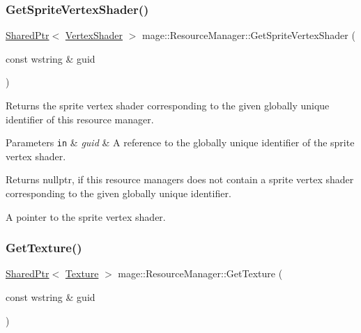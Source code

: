 \subsubsection{\texorpdfstring{Get\+Sprite\+Vertex\+Shader()}{GetSpriteVertexShader()}}
{\footnotesize\ttfamily \hyperlink{namespacemage_a1e01ae66713838a7a67d30e44c67703e}{Shared\+Ptr}$<$ \hyperlink{classmage_1_1_vertex_shader}{Vertex\+Shader} $>$ mage\+::\+Resource\+Manager\+::\+Get\+Sprite\+Vertex\+Shader (\begin{DoxyParamCaption}\item[{const wstring \&}]{guid }\end{DoxyParamCaption})\hspace{0.3cm}{\ttfamily [noexcept]}}

Returns the sprite vertex shader corresponding to the given globally unique identifier of this resource manager.


\begin{DoxyParams}[1]{Parameters}
\mbox{\tt in}  & {\em guid} & A reference to the globally unique identifier of the sprite vertex shader. \\
\hline
\end{DoxyParams}
\begin{DoxyReturn}{Returns}
{\ttfamily nullptr}, if this resource managers does not contain a sprite vertex shader corresponding to the given globally unique identifier. 

A pointer to the sprite vertex shader. 
\end{DoxyReturn}
\hypertarget{classmage_1_1_resource_manager_a2aaa87096cb50a43fdacb5cdb7d729a8}{}\label{classmage_1_1_resource_manager_a2aaa87096cb50a43fdacb5cdb7d729a8} 
\subsubsection{\texorpdfstring{Get\+Texture()}{GetTexture()}}
{\footnotesize\ttfamily \hyperlink{namespacemage_a1e01ae66713838a7a67d30e44c67703e}{Shared\+Ptr}$<$ \hyperlink{classmage_1_1_texture}{Texture} $>$ mage\+::\+Resource\+Manager\+::\+Get\+Texture (\begin{DoxyParamCaption}\item[{const wstring \&}]{guid }\end{DoxyParamCaption})\hspace{0.3cm}{\ttfamily [noexcept]}}

